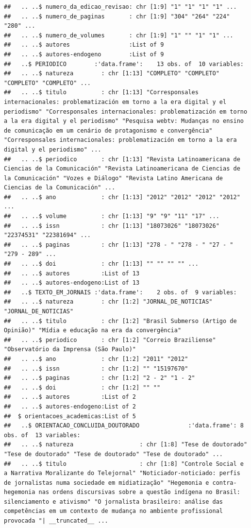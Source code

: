\documentclass[]{article}
\begin{document}
\begin{verbatim}
##   .. ..$ numero_da_edicao_revisao: chr [1:9] "1" "1" "1" "1" ...
##   .. ..$ numero_de_paginas       : chr [1:9] "304" "264" "224" "280" ...
##   .. ..$ numero_de_volumes       : chr [1:9] "1" "" "1" "1" ...
##   .. ..$ autores                 :List of 9
##   .. ..$ autores-endogeno        :List of 9
##   ..$ PERIODICO        :'data.frame':    13 obs. of  10 variables:
##   .. ..$ natureza        : chr [1:13] "COMPLETO" "COMPLETO" "COMPLETO" "COMPLETO" ...
##   .. ..$ titulo          : chr [1:13] "Corresponsales internacionales: problematización em torno a la era digital y el periodismo" "Corresponsales internacionales: problematización em torno a la era digital y el periodismo" "Pesquisa webtv: Mudanças no ensino de comunicação em um cenário de protagonismo e convergência" "Corresponsales internacionales: problematización em torno a la era digital y el periodismo" ...
##   .. ..$ periodico       : chr [1:13] "Revista Latinoamericana de Ciencias de la Comunicación" "Revista Latinoamericana de Ciencias de la Comunicación" "Vozes e Diálogo" "Revista Latino Americana de Ciencias de la Comunicación" ...
##   .. ..$ ano             : chr [1:13] "2012" "2012" "2012" "2012" ...
##   .. ..$ volume          : chr [1:13] "9" "9" "11" "17" ...
##   .. ..$ issn            : chr [1:13] "18073026" "18073026" "22374531" "22381694" ...
##   .. ..$ paginas         : chr [1:13] "278 - " "278 - " "27 - " "279 - 289" ...
##   .. ..$ doi             : chr [1:13] "" "" "" "" ...
##   .. ..$ autores         :List of 13
##   .. ..$ autores-endogeno:List of 13
##   ..$ TEXTO_EM_JORNAIS :'data.frame':    2 obs. of  9 variables:
##   .. ..$ natureza        : chr [1:2] "JORNAL_DE_NOTICIAS" "JORNAL_DE_NOTICIAS"
##   .. ..$ titulo          : chr [1:2] "Brasil Submerso (Artigo de Opinião)" "Mídia e educação na era da convergência"
##   .. ..$ periodico       : chr [1:2] "Correio Braziliense" "Observatório da Imprensa (São Paulo)"
##   .. ..$ ano             : chr [1:2] "2011" "2012"
##   .. ..$ issn            : chr [1:2] "" "15197670"
##   .. ..$ paginas         : chr [1:2] "2 - 2" "1 - 2"
##   .. ..$ doi             : chr [1:2] "" ""
##   .. ..$ autores         :List of 2
##   .. ..$ autores-endogeno:List of 2
##  $ orientacoes_academicas:List of 5
##   ..$ ORIENTACAO_CONCLUIDA_DOUTORADO              :'data.frame': 8 obs. of  13 variables:
##   .. ..$ natureza                   : chr [1:8] "Tese de doutorado" "Tese de doutorado" "Tese de doutorado" "Tese de doutorado" ...
##   .. ..$ titulo                     : chr [1:8] "Controle Social e a Narrativa Moralizante do Telejornal" "Noticiador-noticiado: perfis de jornalistas numa sociedade em midiatização" "Hegemonia e contra-hegemonia nas ordens discursivas sobre a questão indígena no Brasil: silenciamento e ativismo" "O jornalista brasileiro: análise das competências em um contexto de mudança no ambiente profissional provocada "| __truncated__ ...

\end{verbatim}
\end{document}
